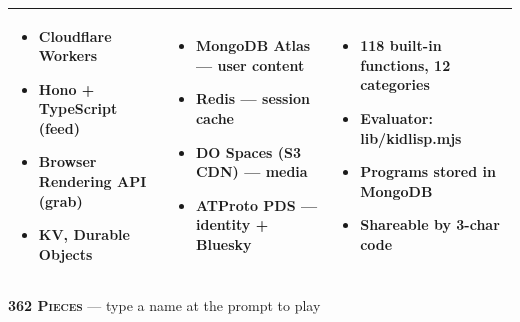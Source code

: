 \documentclass[10pt,letterpaper,twocolumn]{article}
\begin{document}
{\begin{tabularx}{\textwidth}{|X|X|X|}
\begin{itemize}[nosep,leftmargin=0.8em]
\item Cloudflare Workers
\item Hono + TypeScript (feed)
\item Browser Rendering API (grab)
\item KV, Durable Objects
\end{itemize} &
\begin{itemize}[nosep,leftmargin=0.8em]
\item MongoDB Atlas --- user content
\item Redis --- session cache
\item DO Spaces (S3 CDN) --- media
\item ATProto PDS --- identity + Bluesky
\end{itemize} &
\begin{itemize}[nosep,leftmargin=0.8em]
\item 118 built-in functions, 12 categories
\item Evaluator: lib/kidlisp.mjs
\item Programs stored in MongoDB
\item Shareable by 3-char code
\end{itemize} \\
\hline
\end{tabularx}
}

\vspace{0.4em}

\noindent{}

\vspace{0.5em}


\noindent\textbf{\textsc{362 Pieces}} --- type a name at the prompt to play
\end{document}

